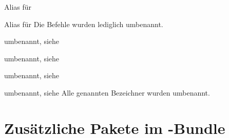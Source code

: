 \documentclass[%
  english,ngerman,%
  headings=optiontoheadandtoc,captions=tableheading,numbers=noenddot,%
  chapterpage,cdfoot,%
]{tudscrman}
\begin{document}
\begin{Declaration}{}{%
  Alias für %
}
\begin{Declaration}{}{%
  Alias für %
}
\printdeclarationlist*%
%
Die Befehle wurden lediglich umbenannt.
\end{Declaration}
\end{Declaration}

\begin{Declaration}{}{umbenannt, siehe }
\begin{Declaration}{}{umbenannt, siehe }
\begin{Declaration}{}{umbenannt, siehe }
\begin{Declaration}{}{%
  umbenannt, siehe %
}
\printdeclarationlist*%
%
Alle genannten Bezeichner wurden umbenannt.
\end{Declaration}
\end{Declaration}
\end{Declaration}
\end{Declaration}



\newcommand*\cdcolorcalc{}
\newcommand*\cdcolorname{}
\newcommand*\cdcolorvalue{}
\newcommand*\cdcolortext{}
\newcommand*\cdcolor[2][0]{%
  \noindent%
  \begin{tikzpicture}[every node/.style={%
    rectangle,minimum height=.1\linewidth,minimum width=25mm%
  }]%
  \def\cdcolorcalc##1##2{%
    \pgfmathparse{100-##1*10}%
    \xdef\cdcolorname{HKS##2!\pgfmathresult}%
    \xdef\cdcolorvalue{\pgfmathresult}%
    \pgfmathparse{10+##1*10}%
  }%
  \foreach \x in {0,1,...,9}{%
    \cdcolorcalc{\x}{#2}%
    \ifnum\x<#1%
      \def\cdcolortext{white}%
    \else%
      \def\cdcolortext{black}%
    \fi%
    \node [fill=\cdcolorname,rotate=90] at (.\x\linewidth,0)%
      {\textcolor{\cdcolortext}{HKS#2!\pgfmathprintnumber\cdcolorvalue}};%
  };%
  \end{tikzpicture}%
}
\chapter{Zusätzliche Pakete im \TUDScript-Bundle}
\end{document}
